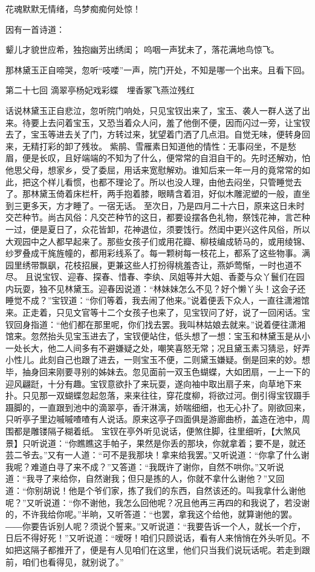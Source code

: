 \documentclass[12pt,oneside]{book}
\begin{document}
花魂默默无情绪，鸟梦痴痴何处惊！

因有一首诗道：

颦儿才貌世应希，独抱幽芳出绣闺；
呜咽一声犹未了，落花满地鸟惊飞。

那林黛玉正自啼哭，忽听“吱喽”一声，院门开处，不知是哪一个出来。且看下回。




 
第二十七回  滴翠亭杨妃戏彩蝶　埋香冢飞燕泣残红


话说林黛玉正自悲泣，忽听院门响处，只见宝钗出来了，宝玉、袭人一群人送了出来。待要上去问着宝玉，又恐当着众人问，羞了他倒不便，因而闪过一旁，让宝钗去了，宝玉等进去关了门，方转过来，犹望着门洒了几点泪。自觉无味，便转身回来，无精打彩的卸了残妆。
紫鹃、雪雁素日知道他的情性：无事闷坐，不是愁眉，便是长叹，且好端端的不知为了什么，便常常的自泪自干的。先时还解劝，怕他思父母，想家乡，受了委屈，用话来宽慰解劝。谁知后来一年一月的竟常常的如此，把这个样儿看惯，也都不理论了。所以也没人理，由他去闷坐，只管睡觉去了。那林黛玉倚着床栏杆，两手抱着膝，眼睛含着泪，好似木雕泥塑的一般，直坐到三更多天，方才睡了。一宿无话。
至次日，乃是四月二十六日，原来这日未时交芒种节。尚古风俗：凡交芒种节的这日，都要设摆各色礼物，祭饯花神，言芒种一过，便是夏日了，众花皆卸，花神退位，须要饯行。然闺中更兴这件风俗，所以大观园中之人都早起来了。那些女孩子们或用花瓣、柳枝编成轿马的，或用绫锦、纱罗叠成干旄旌幢的，都用彩线系了。每一颗树每一枝花上，都系了这些物事。满园里绣带飘飖，花枝招展，更兼这些人打扮得桃羞杏让，燕妒莺惭，一时也道不尽。
且说宝钗、迎春、探春、惜春、李纨、凤姐等并大姐、香菱与众丫鬟们在园内玩耍，独不见林黛玉。迎春因说道：“林妹妹怎么不见？好个懒丫头！这会子还睡觉不成？”宝钗道：“你们等着，我去闹了他来。”说着便丢下众人，一直往潇湘馆来。正走着，只见文官等十二个女孩子也来了，见宝钗问了好，说了一回闲话。宝钗回身指道：“他们都在那里呢，你们找去罢。我叫林姑娘去就来。”说着便往潇湘馆来。忽然抬头见宝玉进去了，宝钗便站住，低头想了一想：宝玉和林黛玉是从小一处长大，他二人间多有不避嫌疑之处，嘲笑喜怒无常；况且黛玉素习猜忌，好弄小性儿。此刻自己也跟了进去，一则宝玉不便，二则黛玉嫌疑。倒是回来的妙。想毕，抽身回来刚要寻别的姊妹去。忽见面前一双玉色蝴蝶，大如团扇，一上一下的迎风翩跹，十分有趣。宝钗意欲扑了来玩耍，遂向袖中取出扇子来，向草地下来扑。只见那一双蝴蝶忽起忽落，来来往往，穿花度柳，将欲过河。倒引得宝钗蹑手蹑脚的，一直跟到池中的滴翠亭，香汗淋漓，娇喘细细，也无心扑了。刚欲回来，只听亭子里边嘁嘁喳喳有人说话。原来这亭子四面俱是游廊曲桥，盖造在池中，周围都是雕镂隔子糊着纸。
宝钗在亭外听见说话，便煞住脚，往里细听，【大煞风景】只听说道：“你瞧瞧这手帕子，果然是你丢的那块，你就拿着；要不是，就还芸二爷去。”又有一人道：“可不是我那块！拿来给我罢。”又听说道：“你拿了什么谢我呢？难道白寻了来不成？”又答道：“我既许了谢你，自然不哄你。”又听说道：“我寻了来给你，自然谢我；但只是拣的人，你就不拿什么谢他？”又回道：“你别胡说！他是个爷们家，拣了我们的东西，自然该还的。叫我拿什么谢他呢？”又听说道：“你不谢他，我怎么回他呢？况且他再三再四的和我说了，若没谢的，不许我给你呢。”半晌，又听答道：“也罢，拿我这个给他，就算谢他的罢。――你要告诉别人呢？须说个誓来。”又听说道：“我要告诉一个人，就长一个疔，日后不得好死！”又听说道：“嗳呀！咱们只顾说话，看有人来悄悄在外头听见。不如把这隔子都推开了，便是有人见咱们在这里，他们只当我们说玩话呢。若走到跟前，咱们也看得见，就别说了。”
\end{document}

